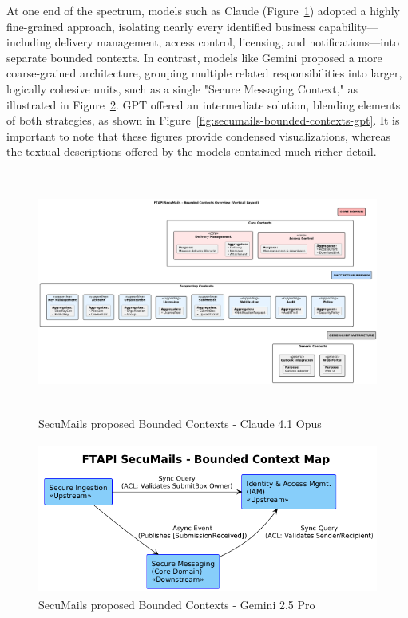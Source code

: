 At one end of the spectrum, models such as Claude (Figure~\ref{fig:secumails-bounded-contexts-claude}) adopted a highly fine-grained approach, isolating nearly every identified business capability—including delivery management, access control, licensing, and notifications—into separate bounded contexts. In contrast, models like Gemini proposed a more coarse-grained architecture, grouping multiple related responsibilities into larger, logically cohesive units, such as a single "Secure Messaging Context," as illustrated in Figure~\ref{fig:secumails-bounded-contexts-gemini}. GPT offered an intermediate solution, blending elements of both strategies, as shown in Figure~\ref{fig:secumails-bounded-contexts-gpt}. It is important to note that these figures provide condensed visualizations, whereas the textual descriptions offered by the models contained much richer detail.

\begin{figure}[htbp]
  \centering
  \includegraphics[height=8cm]{figures/secumails-bounded-contexts-claude.png} 
  \caption{SecuMails proposed Bounded Contexts - Claude 4.1 Opus}
  \label{fig:secumails-bounded-contexts-claude} 
\end{figure}

\begin{figure}[htbp]
  \centering
  \includegraphics[height=5cm]{figures/secumails-bounded-contexts-gemini.png} 
  \caption{SecuMails proposed Bounded Contexts - Gemini 2.5 Pro}
  \label{fig:secumails-bounded-contexts-gemini} 
\end{figure}

